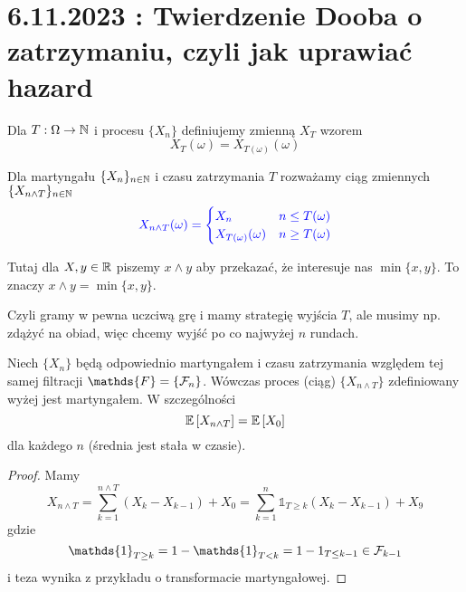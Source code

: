 \section{6.11.2023 : Twierdzenie Dooba o zatrzymaniu, czyli jak uprawiać hazard}

  Dla $T:\Omega\to\operatorname{\mathbb{N}}$ i procesu $\{X_n\}$ definiujemy zmienną $X_T$ wzorem
  $$X_T(\omega)=X_{T(\omega)}(\omega)$$

  Dla martyngału $\{X_n\}_{n\in\operatorname{\mathbb{N}}}$ i czasu zatrzymania $T$ rozważamy ciąg zmiennych $\{X_{n\land T}\}_{n\in\operatorname{\mathbb{N}}}$
  $$\color{blue}X_{n\land T}(\omega)=\begin{cases}X_n& n\leq T(\omega)\\ X_{T(\omega)}(\omega) & n\geq T(\omega) \end{cases}$$

  Tutaj dla $X,y\in\operatorname{\mathbb{R}}$ piszemy $x\land y$ aby przekazać, że interesuje nas $\min\{x,y\}$. To znaczy $x\land y=\min\{x,y\}$.

Czyli gramy w pewna uczciwą grę i mamy strategię wyjścia $T$, ale musimy np. zdążyć na obiad, więc chcemy wyjść po co najwyżej $n$ rundach.

\begin{theorem}
  Niech $\{X_n\}$ będą odpowiednio martyngałem i czasu zatrzymania względem tej samej filtracji $\mathds{F}=\{\set{F}_n\}$. Wówczas proces (ciąg) $\{X_{n\land T}\}$ zdefiniowany wyżej jest martyngałem. W szczególności
  $$\expected{X_{n\land T}}=\expected{X_0}$$
  dla każdego $n$ (średnia jest stała w czasie).
\end{theorem}

\begin{proof}
  Mamy 
  $$X_{n\land T}=\sum_{k=1}^{n\land T}(X_k-X_{k-1})+X_0=\sum_{k=1}^n\mathds{1}_{T\geq k}(X_k-X_{k-1})+X_9$$
  gdzie
  $$\mathds{1}_{T\geq k}=1-\mathds{1}_{T<k}=1-1_{T\leq k-1}\in \set{F}_{k-1}$$
  i teza wynika z przykładu o transformacie martyngałowej.
\end{proof}

